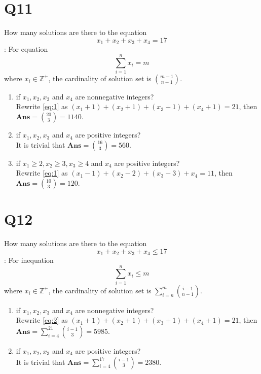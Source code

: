 \documentclass[11pt]{article}
\newenvironment{qparts}{\begin{enumerate}[{(}a{)}]}{\end{enumerate}}
\newenvironment{solution}{{\\\bf Solution}:}{\smallskip}
\begin{document}
\section*{Q11}
How many solutions are there to the equation
\begin{equation}
  x_1+x_2+x_3+x_4=17\label{eq:1}
\end{equation}
\begin{solution}
    For equation 
    $$
    \sum_{i=1}^{n}x_{i }=m
    $$ where $x_{i }\in \mathbb{Z}^{+}$, the cardinality of solution set 
    is $\binom{m-1}{n-1}$.
    \begin{qparts}
    
        \item  if $x_1,x_2,x_3$ and $x_4$ are nonnegative integers?\\
        Rewrite \eqref{eq:1} as $(x_1+1)+ (x_2+1)+ (x_3+1)+ (x_4+1)=21$, then 
        $\textbf{Ans}=\binom{20}{3}=1140$.
    
        \item  if $x_1,x_2,x_3$ and $x_4$ are positive integers?\\
        It is trivial that $\textbf{Ans}=\binom{16}{3}=560$.
    
        \item  if $x_1\ge 2,x_2\ge 3,x_3\ge 4$ and $x_4$ are positive integers?\\
        Rewrite \eqref{eq:1} as $(x_1-1)+ (x_2-2)+ (x_3-3)+ x_4=11$, then
        $\textbf{Ans}=\binom{10}{3}=120$.
    \end{qparts}
\end{solution}


\section*{Q12}
How many solutions are there to the equation 
\begin{equation}
  x_1+x_2+x_3+x_4\le 17 \label{eq:2}
\end{equation}
\begin{solution}
    For inequation 
    $$
    \sum_{i=1}^{n}x_{i }\le m
    $$ where $x_{i }\in \mathbb{Z}^{+}$, the cardinality of solution set 
    is $\sum_{i= n}^{m}\binom{i-1}{n-1}$.

    \begin{qparts}
        \item  if $x_1,x_2,x_3$ and $x_4$ are nonnegative integers?\\
        Rewrite \eqref{eq:2} as $(x_1+1)+ (x_2+1)+ (x_3+1)+ (x_4+1)=21$, then 
        $\textbf{Ans}=\sum_{i=4}^{21}\binom{i-1}{3}=5985$.
        
        \item  if $x_1,x_2,x_3$ and $x_4$ are positive integers?\\
        It is trivial that $\textbf{Ans}=\sum_{i=4}^{17}\binom{i-1}{3}=2380$.

    \end{qparts}
\end{solution}
\end{document}
